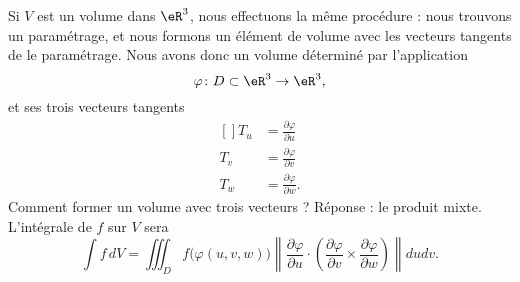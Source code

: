 Si $V$ est un volume dans $\eR^3$, nous effectuons la même procédure : nous trouvons un paramétrage, et nous formons un élément de volume avec les vecteurs tangents de le paramétrage. Nous avons donc un volume déterminé par l'application
\begin{equation}
	\varphi\colon D\subset\eR^3\to \eR^3,
\end{equation}
et ses trois vecteurs tangents
\begin{equation}
	\begin{aligned}[]
		T_u & =\frac{ \partial \varphi }{ \partial u }  \\
		T_v & =\frac{ \partial \varphi }{ \partial v }  \\
		T_w & =\frac{ \partial \varphi }{ \partial w }.
	\end{aligned}
\end{equation}
Comment former un volume avec trois vecteurs ? Réponse : le produit mixte. L'intégrale de $f$ sur $V$ sera
\begin{equation}
	\int f\,dV=\iiint_D f\big( \varphi(u,v,w) \big)\left\| \frac{ \partial \varphi }{ \partial u }\cdot \left( \frac{ \partial \varphi }{ \partial v }\times\frac{ \partial \varphi }{ \partial w }\right) \right\|dudv.
\end{equation}


